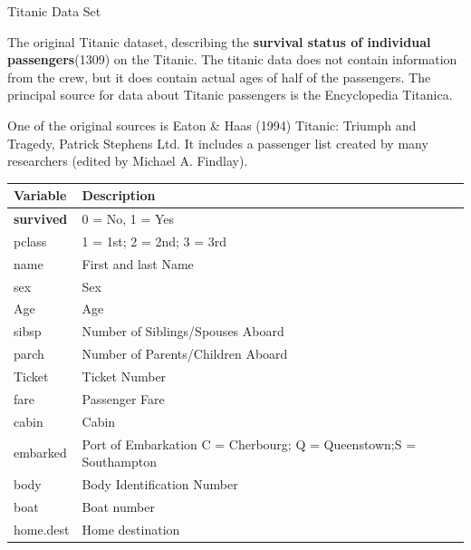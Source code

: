 \documentclass[11pt,compress,t,notes=noshow, xcolor=table]{beamer}
\begin{document}
\begin{vbframe}{Titanic Data Set}




The original Titanic dataset, describing the \textbf{survival status of individual passengers}(1309) on the Titanic.
The titanic data does not contain information from the crew, but it does contain actual ages of half of the passengers.
The principal source for data about Titanic passengers is the Encyclopedia Titanica.

One of the original sources is Eaton \& Haas (1994) Titanic: Triumph and Tragedy, Patrick Stephens Ltd.
It includes a passenger list created by many researchers (edited by Michael A. Findlay).

\framebreak

\footnotesize
\begin{table}
    \begin{tabularx}{\textwidth}{l:X}
    Variable & Description \\
    \hline
    \textbf{survived}  & 0 = No, 1 = Yes                                                    \\
    pclass    & 1 = 1st; 2 = 2nd; 3 = 3rd                                          \\
    name      & First and last Name                                                \\
    sex       & Sex                                                                \\
    Age       & Age                                                                \\
    sibsp     & Number of Siblings/Spouses Aboard	                                 \\
    parch     & Number of Parents/Children Aboard	                                 \\
    Ticket    & Ticket Number                                                      \\
    fare      & Passenger Fare                                                     \\
    cabin     & Cabin                                                              \\
    embarked  & Port of Embarkation	C = Cherbourg; Q = Queenstown;\newline S = Southampton \\
    body      & Body Identification Number                                         \\
    boat      & Boat number                                                        \\
    home.dest & Home destination                                                   \\
    \end{tabularx}
\end{table}


\end{vbframe}
\end{document}
